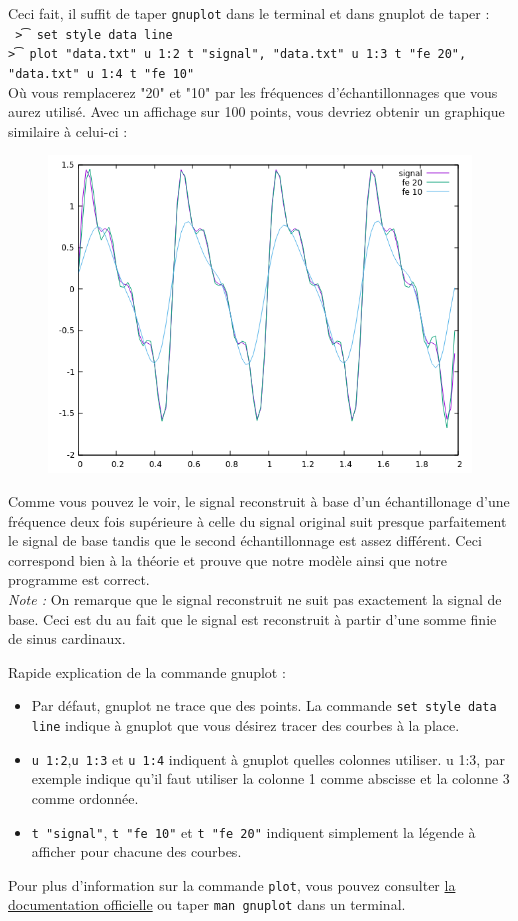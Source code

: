 \documentclass[11pt]{article}
\begin{document}
\begin{enumerate}
Ceci fait, il suffit de taper \texttt{gnuplot} dans le terminal et dans gnuplot de taper : \\
\texttt{
\t > set style data line\\
\t > plot "data.txt" u 1:2 t "signal", "data.txt" u 1:3 t "fe 20",\\
"data.txt" u 1:4 t "fe 10"\\
}
Où vous remplacerez "20" et "10" par les fréquences d'échantillonnages que vous aurez utilisé. Avec un affichage sur 100 points, vous devriez obtenir un graphique similaire à celui-ci :
\begin{figure}[H] 
\centering
\includegraphics[scale=0.75]{Figures/Result.png}
\end{figure}

Comme vous pouvez le voir, le signal reconstruit à base d'un échantillonage d'une fréquence deux fois supérieure à celle du signal original suit presque parfaitement le signal de base tandis que le second échantillonnage est assez différent. Ceci correspond bien à la théorie et prouve que notre modèle ainsi que notre programme est correct.\\
 \textit{Note :} On remarque que le signal reconstruit ne suit pas exactement la signal de base. Ceci est du au fait que le signal est reconstruit à partir d'une somme finie de sinus cardinaux.

Rapide explication de la commande gnuplot : 
\begin{itemize}
\item Par défaut, gnuplot ne trace que des points. La commande \texttt{set style data line} indique à gnuplot que vous désirez tracer des courbes à la place.
\item \texttt{u 1:2},\texttt{u 1:3} et \texttt{u 1:4} indiquent à gnuplot quelles colonnes utiliser. u 1:3, par exemple indique qu'il faut utiliser la colonne 1 comme abscisse et la colonne 3 comme ordonnée.
\item \texttt{t "signal"}, \texttt{t "fe 10"} et \texttt{t "fe 20"} indiquent simplement la légende à afficher pour chacune des courbes.  
\end{itemize}

Pour plus d'information sur la commande \texttt{plot}, vous pouvez consulter \href{http://www.gnuplot.info/documentation.html}{la documentation officielle} ou taper \texttt{man gnuplot} dans un terminal.

\end{enumerate}
\end{document}
